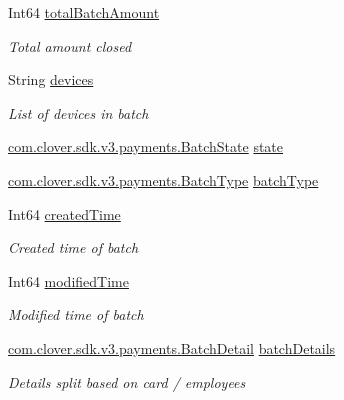 \begin{DoxyCompactItemize}
Int64 \hyperlink{classcom_1_1clover_1_1sdk_1_1v3_1_1payments_1_1_batch_a9e47c2f64ca733efdddef7c6071e30dc}{total\+Batch\+Amount}
\begin{DoxyCompactList}\small\item\em Total amount closed \end{DoxyCompactList}\item 
String \hyperlink{classcom_1_1clover_1_1sdk_1_1v3_1_1payments_1_1_batch_a6b6b34ecc7474d320e8e9aee4e12686f}{devices}
\begin{DoxyCompactList}\small\item\em List of devices in batch \end{DoxyCompactList}\item 
\hyperlink{namespacecom_1_1clover_1_1sdk_1_1v3_1_1payments_afd1102ee7e347adf5b7343518d146859}{com.\+clover.\+sdk.\+v3.\+payments.\+Batch\+State} \hyperlink{classcom_1_1clover_1_1sdk_1_1v3_1_1payments_1_1_batch_ad48da987bf8578c360dcb871ad8e7bb2}{state}
\item 
\hyperlink{namespacecom_1_1clover_1_1sdk_1_1v3_1_1payments_aa661d537c95b582976caf4a1745309f6}{com.\+clover.\+sdk.\+v3.\+payments.\+Batch\+Type} \hyperlink{classcom_1_1clover_1_1sdk_1_1v3_1_1payments_1_1_batch_a4711c53b9ea807ccad577a3e91a96d76}{batch\+Type}
\item 
Int64 \hyperlink{classcom_1_1clover_1_1sdk_1_1v3_1_1payments_1_1_batch_ad373165fdf9082ad913cae5ff2bb7ffe}{created\+Time}
\begin{DoxyCompactList}\small\item\em Created time of batch \end{DoxyCompactList}\item 
Int64 \hyperlink{classcom_1_1clover_1_1sdk_1_1v3_1_1payments_1_1_batch_a811026e93daa11d7e31b6902b339decf}{modified\+Time}
\begin{DoxyCompactList}\small\item\em Modified time of batch \end{DoxyCompactList}\item 
\hyperlink{classcom_1_1clover_1_1sdk_1_1v3_1_1payments_1_1_batch_detail}{com.\+clover.\+sdk.\+v3.\+payments.\+Batch\+Detail} \hyperlink{classcom_1_1clover_1_1sdk_1_1v3_1_1payments_1_1_batch_a8aba80ba38915a628d8ff572102a76f2}{batch\+Details}
\begin{DoxyCompactList}\small\item\em Details split based on card / employees \end{DoxyCompactList}\end{DoxyCompactItemize}


